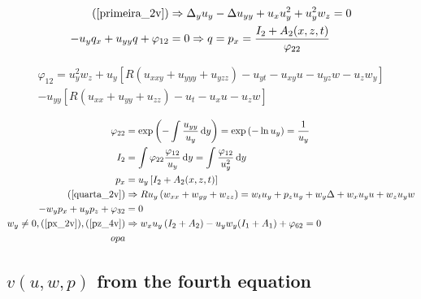 \documentclass[12pt,a4paper]{article}
\begin{document}
	\begin{align}
    (\ref{primeira_2v}) &\Rightarrow \Delta_y u_y - \Delta u_{yy} + u_x u_y^2 + u_y^2 w_z = 0 \\
    -u_y q_x + u_{yy} q + \varphi_{12} &= 0 \Rightarrow q = p_x = \frac{I_2 + A_2(x,z,t)}{\varphi_{22}}
	\end{align}

	\begin{multline}
    \varphi_{12} = u_y^2 w_z + u_y \left[ R \left(u_{xxy} + u_{yyy} + u_{yzz} \right) - u_{yt} - u_{xy} u - u_{yz} w - u_z w_y \right] \\
    - u_{yy} \left[ R \left(u_{xx} + u_{yy} + u_{zz} \right) - u_t - u_x u - u_z w \right]
	\end{multline}

	\begin{align}
	  \varphi_{22} &= \exp \left(- \int{ \frac{u_{yy}}{u_y} \,\mathrm{d} y} \right) = \exp \left(- \ln u_y \right) = \frac{1}{u_y} \\
	  I_2 &= \int{ \varphi_{22} \frac{\varphi_{12} }{u_y} \,\mathrm{d} y} = \int{ \frac{\varphi_{12}}{u_y^2} \,\mathrm{d} y} \\
	  p_x &= u_y \left[ I_2 + A_2(x,z,t) \right] \label{px_2v} \\
      (\ref{quarta_2v}) &\Rightarrow R u_y \left(w_{xx} + w_{yy} + w_{zz} \right) = w_t u_y + p_z u_y + w_y \Delta + w_x u_y u + w_z u_y w \\
      -w_y p_x + u_y p_z + \varphi_{32} &= 0 \\
      w_y \neq 0, (\ref{px_2v}), (\ref{pz_4v}) &\Rightarrow w_x u_y \left(I_2 + A_2 \right) - u_y w_y (I_1 + A_1) + \varphi_{62} = 0 \\
	  opa
	\end{align}


	\begin{flushright}
	\end{flushright}

	\subsection{$v(u,w,p)$ from the fourth equation}
\end{document}
